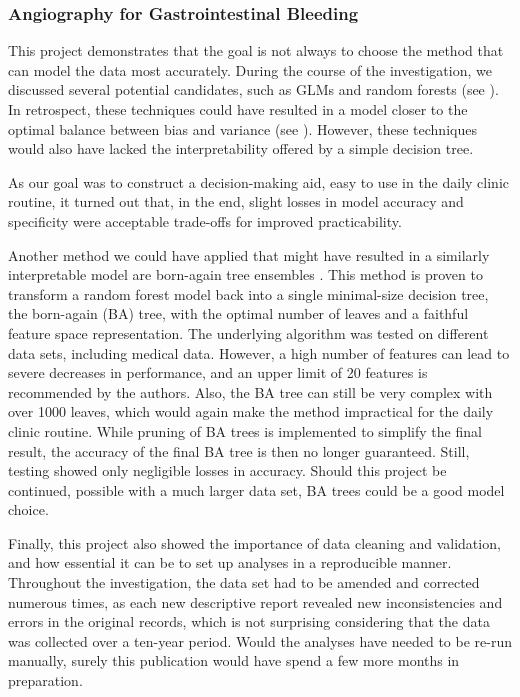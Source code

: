 \subsubsection{Angiography for Gastrointestinal Bleeding}
\label{subsubsec:angio}

This project demonstrates that the goal is not always to choose the method
that can model the data most accurately. During the course of the
investigation, we discussed several potential candidates, such as GLMs and
random forests (see ). In retrospect, these
techniques could have resulted in a model closer to the optimal balance
between bias and variance (see ). However, these
techniques would also have lacked the interpretability offered by a simple
decision tree.

As our goal was to construct a decision-making aid, easy to use in the daily
clinic routine, it turned out that, in the end, slight losses in model
accuracy and specificity were acceptable trade-offs for improved practicability.

Another
method we could have applied that might have resulted in a similarly
interpretable model are born-again tree ensembles \citep{Sagi2020,Vidal2020}.
This method is proven to transform a random forest model back into a single
minimal-size decision tree, the born-again (BA) tree, with the optimal number
of leaves and a faithful feature space representation. The underlying
algorithm was tested on different data sets, including medical data. However,
a high number of features can lead to severe decreases in performance, and an
upper limit of \num{20} features is recommended by the authors. Also, the BA
tree can still be very complex with over \num{1000} leaves, which would again
make the method impractical for the daily clinic routine. While pruning of BA
trees is implemented to simplify the final result, the accuracy of the final
BA tree is then no longer guaranteed. Still, testing showed only negligible
losses in accuracy. Should this project be continued, possible with a much
larger data set, BA trees could be a good model choice.

Finally, this project also showed the importance of data cleaning and
validation, and how essential it can be to set up analyses in a reproducible
manner. Throughout the investigation, the data set had to be amended and
corrected numerous times, as each new descriptive report revealed new
inconsistencies and errors in the original records, which is not surprising
considering that the data was collected over a ten-year period. Would the
analyses have needed to be re-run manually, surely this publication would have
spend a few more months in preparation.

